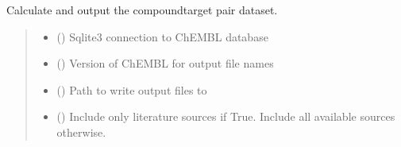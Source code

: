 \documentclass[letterpaper,10pt,english]{sphinxmanual}
\begin{document}
\begin{fulllineitems}
\label{\detokenize{get_dataset:get_dataset.get_ct_pair_dataset}}
\pysigstartsignatures
{}
\pysigstopsignatures
\sphinxAtStartPar
Calculate and output the compound\sphinxhyphen{}target pair dataset.
\begin{quote}\begin{description}
\begin{itemize}
\item {} 
\sphinxAtStartPar
{} () \textendash{} Sqlite3 connection to ChEMBL database

\item {} 
\sphinxAtStartPar
{} () \textendash{} Version of ChEMBL for output file names

\item {} 
\sphinxAtStartPar
{} () \textendash{} Path to write output files to

\item {} 
\sphinxAtStartPar
{} () \textendash{} Include only literature sources if True. Include all available sources otherwise.


\end{itemize}
\end{description}
\end{quote}
\end{fulllineitems}
\end{document}
